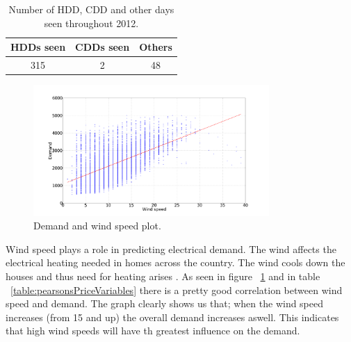 \begin{table}[H]
\centering
\begin{tabular}{|c|c|c|} 
	\hline
HDDs seen & CDDs seen & Others \\ [0.5ex]
\hline
315 & 2 & 48 \\  \hline
\end{tabular}
\caption{Number of HDD, CDD and other days seen throughout 2012.} %
\label{table:CDD_HDD} %
\end{table}

\begin{figure}[H]
\centering
\includegraphics[width=0.8\textwidth ]{billeder/energy_price_plots/consump_wind.png}
\caption{Demand and wind speed plot.}
\label{fig:consump_wind}
\end{figure}

Wind speed plays a role in predicting electrical demand. The wind affects the electrical heating needed in homes across the country. The wind cools down the houses and thus need for heating arises \cite{19}. As seen in figure ~\ref{fig:consump_wind} and in table ~\ref{table:pearsonsPriceVariables} there is a pretty good correlation between wind speed and demand. The graph clearly shows us that; when the wind speed increases (from 15 and up) the overall demand increases aswell. This indicates that high wind speeds will have th greatest influence on the demand.


